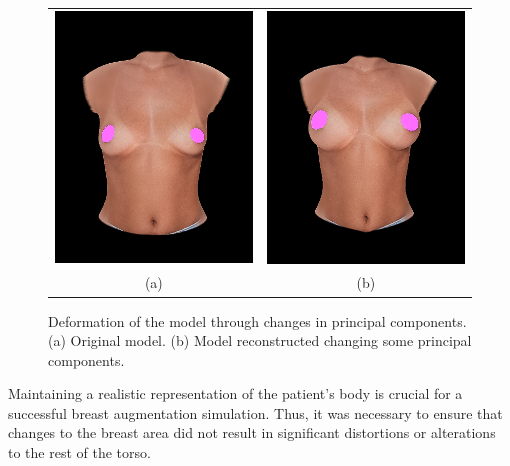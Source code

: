 \begin{figure}[H]
    \centering
    \begin{tabular}{@{}cc@{}}
        \includegraphics[width=0.487\linewidth]{figures/20230529-pca_deformation_3.jpg}&
        \includegraphics[width=0.487\linewidth]{figures/20230529-pca_deformation_4.jpg}\\
        (a)&(b)\\
        \end{tabular}
    \caption[Model deformation]{Deformation of the model through changes in principal components.
    \textup{(a)} Original model.
    \textup{(b)} Model reconstructed changing some principal components.
    }

    \label{fig:pca_deformation}
\end{figure}

Maintaining a realistic representation of the patient's body is crucial for a successful breast augmentation simulation. Thus, it was necessary to ensure that changes to the breast 
area did not result in significant distortions or alterations to the rest of the torso.

